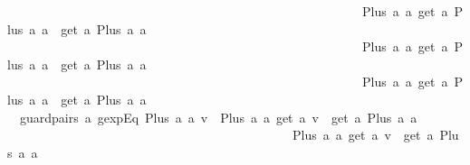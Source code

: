 \begin{isabellebody}
\ \ \ \ \ \ \ \ \ \ \ \ \ \ \ \ \ \ \ \ \ \ \ \ \ \ \ \ \ \ \ \ \ \ \ \ \ \ \ \ \ \ \ \ \ \ \ \ \ \ \ \ \ \ \ \ {\isacharparenleft}{\isacharparenleft}Plus\ a{}\ a{}{\isacharparenright}{\isacharcomma}\ {\isacharparenleft}get\ a\ {\isacharparenleft}Plus\ a{}\ a{}{\isacharparenright}{\isacharparenright}\ {\isacharbar}{\isasymunion}{\isacharbar}\ {\isacharparenleft}get\ a\ {\isacharparenleft}Plus\ a{}\ a{}{\isacharparenright}{\isacharparenright}{\isacharparenright}{\isacharcomma}\isanewline
\ \ \ \ \ \ \ \ \ \ \ \ \ \ \ \ \ \ \ \ \ \ \ \ \ \ \ \ \ \ \ \ \ \ \ \ \ \ \ \ \ \ \ \ \ \ \ \ \ \ \ \ \ \ \ \ {\isacharparenleft}{\isacharparenleft}Plus\ a{}\ a{}{\isacharparenright}{\isacharcomma}\ {\isacharparenleft}get\ a\ {\isacharparenleft}Plus\ a{}\ a{}{\isacharparenright}{\isacharparenright}\ {\isacharbar}{\isasymunion}{\isacharbar}\ {\isacharparenleft}get\ a\ {\isacharparenleft}Plus\ a{}\ a{}{\isacharparenright}{\isacharparenright}{\isacharparenright}{\isacharcomma}\isanewline
\ \ \ \ \ \ \ \ \ \ \ \ \ \ \ \ \ \ \ \ \ \ \ \ \ \ \ \ \ \ \ \ \ \ \ \ \ \ \ \ \ \ \ \ \ \ \ \ \ \ \ \ \ \ \ \ {\isacharparenleft}{\isacharparenleft}Plus\ a{}\ a{}{\isacharparenright}{\isacharcomma}\ {\isacharparenleft}get\ a\ {\isacharparenleft}Plus\ a{}\ a{}{\isacharparenright}{\isacharparenright}\ {\isacharbar}{\isasymunion}{\isacharbar}\ {\isacharparenleft}get\ a\ {\isacharparenleft}Plus\ a{}\ a{}{\isacharparenright}{\isacharparenright}{\isacharparenright}{\isacharbrackright}{\isachardoublequoteclose}\ {\isacharbar}\isanewline
\ \ {\isachardoublequoteopen}guard{}pairs\ a\ {\isacharparenleft}gexp{\isachardot}Eq\ {\isacharparenleft}Plus\ a{}\ a{}{\isacharparenright}\ v{\isacharparenright}\ {\isacharequal}\ {\isacharbrackleft}{\isacharparenleft}{\isacharparenleft}Plus\ a{}\ a{}{\isacharparenright}{\isacharcomma}\ {\isacharparenleft}get\ a\ v{\isacharparenright}\ {\isacharbar}{\isasymunion}{\isacharbar}\ {\isacharparenleft}get\ a\ {\isacharparenleft}Plus\ a{}\ a{}{\isacharparenright}{\isacharparenright}{\isacharparenright}{\isacharcomma}\isanewline
\ \ \ \ \ \ \ \ \ \ \ \ \ \ \ \ \ \ \ \ \ \ \ \ \ \ \ \ \ \ \ \ \ \ \ \ \ \ \ \ \ \ \ \ \ {\isacharparenleft}{\isacharparenleft}Plus\ a{}\ a{}{\isacharparenright}{\isacharcomma}\ {\isacharparenleft}get\ a\ v{\isacharparenright}\ {\isacharbar}{\isasymunion}{\isacharbar}\ {\isacharparenleft}get\ a\ {\isacharparenleft}Plus\ a{}\ a{}{\isacharparenright}{\isacharparenright}{\isacharparenright}{\isacharcomma}\isanewline

\end{isabellebody}
